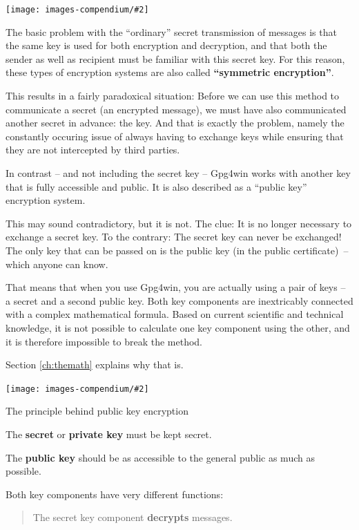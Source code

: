 \documentclass[a4paper,11pt,oneside,openright,titlepage]{scrbook}
\newcommand{\IncludeImage}[2][]{
\begin{center}
  \texttt{[image: images-compendium/\#2]}%
\end{center}
}
\begin{document}
\IncludeImage[width=0.5\textwidth]{tangled-schlapphut}

The basic problem with the ``ordinary'' secret transmission of messages
is that the same key is used for both encryption and decryption, and
that both the sender as well as recipient must be familiar with this
secret key. For this reason, these types of encryption systems are
also called \textbf{``symmetric encryption''}.

This results in a fairly paradoxical situation: Before we can use this
method to communicate a secret (an encrypted message), we must have
also communicated another secret in advance: the key. And that is
exactly the problem, namely the constantly occuring issue of
always having to exchange keys while ensuring that they are not
intercepted by third parties.


\clearpage
In contrast -- and not including the secret key -- Gpg4win works with
another key that is fully accessible and public. It is also described
as a ``public key'' encryption system.

This may sound contradictory, but it is not. The clue: It is no longer
necessary to exchange a secret key. To the contrary: The secret key
can never be exchanged! The only key that can be passed on is the
public key (in the public certificate)~-- which anyone can know.

That means that when you use Gpg4win, you are actually using a pair of
keys -- a secret and a second public key. Both key
components are inextricably connected with a complex mathematical
formula. Based on current scientific and technical knowledge, it is
not possible to calculate one key component using the other, and it is
therefore impossible to break the method.

Section \ref{ch:themath} explains why that is.


\IncludeImage[width=0.5\textwidth]{verleihnix}


\clearpage
The principle behind public key encryption

The \textbf{secret} or \textbf{private key} must be kept secret.

The \textbf{public key} should be as accessible to the general public as much as
possible.

Both key components have very different functions:

\bigskip

\begin{quote}
    The secret key component \textbf{decrypts} messages.
\end{quote}
\end{document}
